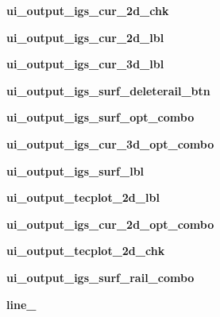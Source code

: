 \begin{DoxyCompactItemize}
\item 
\hypertarget{a00075_ab532154d6273918060a4d4ef92599e20}{}\label{a00075_ab532154d6273918060a4d4ef92599e20} 
{\bfseries ui\+\_\+output\+\_\+igs\+\_\+cur\+\_\+2d\+\_\+chk}
\item 
\hypertarget{a00075_a56d9b0f2bb1161b50e6cd020b28106b2}{}\label{a00075_a56d9b0f2bb1161b50e6cd020b28106b2} 
{\bfseries ui\+\_\+output\+\_\+igs\+\_\+cur\+\_\+2d\+\_\+lbl}
\item 
\hypertarget{a00075_a47a1df1f89ca935117346098ed96fd98}{}\label{a00075_a47a1df1f89ca935117346098ed96fd98} 
{\bfseries ui\+\_\+output\+\_\+igs\+\_\+cur\+\_\+3d\+\_\+lbl}
\item 
\hypertarget{a00075_a5b1e25fc04ca17a3a8d6fbad21981539}{}\label{a00075_a5b1e25fc04ca17a3a8d6fbad21981539} 
{\bfseries ui\+\_\+output\+\_\+igs\+\_\+surf\+\_\+deleterail\+\_\+btn}
\item 
\hypertarget{a00075_a42e57cade8b6c21d81aeee2be06bb581}{}\label{a00075_a42e57cade8b6c21d81aeee2be06bb581} 
{\bfseries ui\+\_\+output\+\_\+igs\+\_\+surf\+\_\+opt\+\_\+combo}
\item 
\hypertarget{a00075_ad689a6c3856be67dc806b3334f032fb6}{}\label{a00075_ad689a6c3856be67dc806b3334f032fb6} 
{\bfseries ui\+\_\+output\+\_\+igs\+\_\+cur\+\_\+3d\+\_\+opt\+\_\+combo}
\item 
\hypertarget{a00075_afdd12bfad9e3808e8f183f9c5c1a7083}{}\label{a00075_afdd12bfad9e3808e8f183f9c5c1a7083} 
{\bfseries ui\+\_\+output\+\_\+igs\+\_\+surf\+\_\+lbl}
\item 
\hypertarget{a00075_a33a702cecbba7090c938c1eabfd57669}{}\label{a00075_a33a702cecbba7090c938c1eabfd57669} 
{\bfseries ui\+\_\+output\+\_\+tecplot\+\_\+2d\+\_\+lbl}
\item 
\hypertarget{a00075_aead15c2fb2cb4c70becfc3f7f5dc96bf}{}\label{a00075_aead15c2fb2cb4c70becfc3f7f5dc96bf} 
{\bfseries ui\+\_\+output\+\_\+igs\+\_\+cur\+\_\+2d\+\_\+opt\+\_\+combo}
\item 
\hypertarget{a00075_a8f3110a97b17d4203ce917f6256fea2b}{}\label{a00075_a8f3110a97b17d4203ce917f6256fea2b} 
{\bfseries ui\+\_\+output\+\_\+tecplot\+\_\+2d\+\_\+chk}
\item 
\hypertarget{a00075_a409bbf4eb732237d4d562061912c2f01}{}\label{a00075_a409bbf4eb732237d4d562061912c2f01} 
{\bfseries ui\+\_\+output\+\_\+igs\+\_\+surf\+\_\+rail\+\_\+combo}
\item 
\hypertarget{a00075_a1a185947c45f1883377113ae7bb13bf3}{}\label{a00075_a1a185947c45f1883377113ae7bb13bf3} 
{\bfseries line\+\_}
\item 

\end{DoxyCompactItemize}
